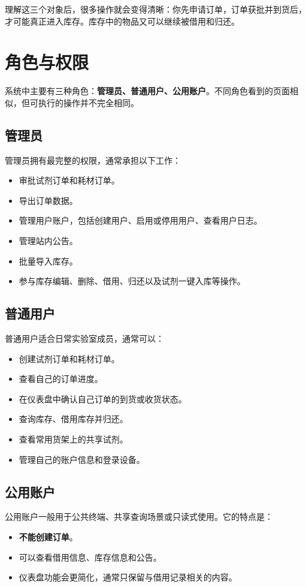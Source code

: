 \documentclass[12pt,a4paper]{ctexart}
\begin{document}
理解这三个对象后，很多操作就会变得清晰：你先申请订单，订单获批并到货后，才可能真正进入库存。库存中的物品又可以继续被借用和归还。

\newpage
\section{角色与权限}

系统中主要有三种角色：\textbf{管理员、普通用户、公用账户}。不同角色看到的页面相似，但可执行的操作并不完全相同。

\subsection{管理员}
管理员拥有最完整的权限，通常承担以下工作：
\begin{itemize}
  \item 审批试剂订单和耗材订单。
  \item 导出订单数据。
  \item 管理用户账户，包括创建用户、启用或停用用户、查看用户日志。
  \item 管理站内公告。
  \item 批量导入库存。
  \item 参与库存编辑、删除、借用、归还以及试剂一键入库等操作。
\end{itemize}

\subsection{普通用户}
普通用户适合日常实验室成员，通常可以：
\begin{itemize}
  \item 创建试剂订单和耗材订单。
  \item 查看自己的订单进度。
  \item 在仪表盘中确认自己订单的到货或收货状态。
  \item 查询库存、借用库存并归还。
  \item 查看常用货架上的共享试剂。
  \item 管理自己的账户信息和登录设备。
\end{itemize}

\subsection{公用账户}
公用账户一般用于公共终端、共享查询场景或只读式使用。它的特点是：
\begin{itemize}
  \item \textbf{不能创建订单}。
  \item 可以查看借用信息、库存信息和公告。
  \item 仪表盘功能会更简化，通常只保留与借用记录相关的内容。
\end{itemize}
\end{document}
